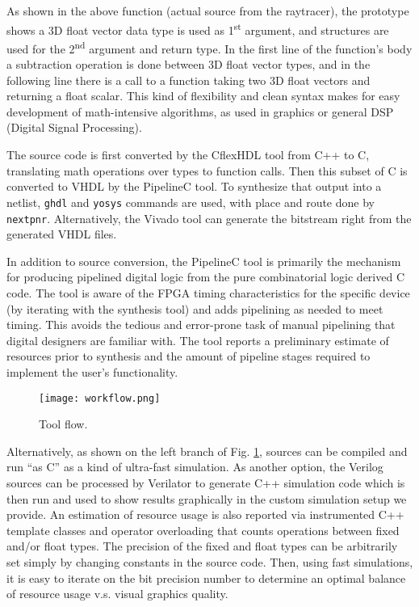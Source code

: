 \documentclass[conference]{IEEEtran}
\begin{document}
As shown in the above function (actual source from the raytracer), the prototype shows a 3D float vector data type is used as 1\textsuperscript{st} argument, and structures are used for the 2\textsuperscript{nd} argument and return type. In the first line of the function's body a subtraction operation is done between 3D float vector types, and in the following line there is a call to a function taking two 3D float vectors and returning a float scalar. This kind of flexibility and clean syntax makes for easy development of math-intensive algorithms, as used in graphics or general DSP (Digital Signal Processing). 

The source code is first converted by the CflexHDL tool from C++ to C, translating math operations over types to function calls. Then this subset of C is converted to VHDL by the PipelineC tool. To synthesize that output into a netlist, \texttt{ghdl} and \texttt{yosys} commands are used, with place and route done by \texttt{nextpnr}. Alternatively, the Vivado tool can generate the bitstream right from the generated VHDL files.

In addition to source conversion, the PipelineC tool is primarily the mechanism for producing pipelined digital logic from the pure combinatorial logic derived C code. The tool is aware of the FPGA timing characteristics for the specific device (by iterating with the synthesis tool) and adds pipelining as needed to meet timing. This avoids the tedious and error-prone task of manual pipelining that digital designers are familiar with. The tool reports a preliminary estimate of resources prior to synthesis and the amount of pipeline stages required to implement the user’s functionality.

\begin{figure}
\texttt{[image: workflow.png]}
\caption{Tool flow.}
\label{figflow}
\end{figure}

Alternatively, as shown on the left branch of Fig. \ref{figflow}, sources can be compiled and run “as C” as a kind of ultra-fast simulation. As another option, the Verilog sources can be processed by Verilator to generate C++ simulation code which is then run and used to show results graphically in the custom simulation setup we provide. An estimation of resource usage is also reported via instrumented C++ template classes and operator overloading that counts operations between fixed and/or float types. The precision of the fixed and float types can be arbitrarily set simply by changing constants in the source code. Then, using fast simulations, it is easy to iterate on the bit precision number to determine an optimal balance of resource usage v.s. visual graphics quality.
\end{document}
